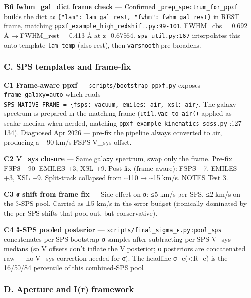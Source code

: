 \documentclass[
  10pt,
]{article}
\begin{document}
\textbf{B6 fwhm\_gal\_dict frame check} --- Confirmed \texttt{\_prep\_spectrum\_for\_ppxf} builds the dict as \texttt{\{"lam":\ lam\_gal\_rest,\ "fwhm":\ fwhm\_gal\_rest\}} in REST frame, matching
\texttt{ppxf\_example\_high\_redshift.py:99-101}. FWHM\_obs = 0.692 Å → FWHM\_rest = 0.413 Å at z=0.67564. \texttt{sps\_util.py:167} interpolates this onto template \texttt{lam\_temp} (also rest),
then \texttt{varsmooth} pre-broadens.

\hypertarget{c.-sps-templates-and-frame-fix}{%
\subsubsection{C. SPS templates and frame-fix}\label{c.-sps-templates-and-frame-fix}}

\textbf{C1 Frame-aware ppxf} --- \texttt{scripts/bootstrap\_ppxf.py} exposes \texttt{frame\_galaxy=\textquotesingle{}auto\textquotesingle{}} which reads
\texttt{SPS\_NATIVE\_FRAME\ =\ \{fsps:\ vacuum,\ emiles:\ air,\ xsl:\ air\}}. The galaxy spectrum is prepared in the matching frame (\texttt{util.vac\_to\_air()} applied as scalar median when needed,
matching \texttt{ppxf\_example\_kinematics\_sdss.py} :127-134). Diagnosed Apr 2026 --- pre-fix the pipeline always converted to air, producing a −90 km/s FSPS V\_sys offset.

\textbf{C2 V\_sys closure} --- Same galaxy spectrum, swap only the frame. Pre-fix: FSPS −90, EMILES +3, XSL +9. Post-fix (frame-aware): FSPS −7, EMILES +3, XSL +9. Split-track collapsed from
\textasciitilde110 → \textasciitilde15 km/s. NOTES Test 3.

\textbf{C3 σ shift from frame fix} --- Side-effect on σ: ≤5 km/s per SPS, ≤2 km/s on the 3-SPS pool. Carried as ±5 km/s in the error budget (ironically dominated by the per-SPS shifts that pool out,
but conservative).

\textbf{C4 3-SPS pooled posterior} --- \texttt{scripts/final\_sigma\_e.py:pool\_sps} concatenates per-SPS bootstrap σ samples after subtracting per-SPS V\_sys medians (so V offsets don't inflate the V
posterior; σ posteriors are concatenated raw --- no V\_sys correction needed for σ). The headline σ\_e(\textless R\_e) is the 16/50/84 percentile of this combined-SPS pool.

\hypertarget{d.-aperture-and-ir-framework}{%
\subsubsection{D. Aperture and I(r) framework}\label{d.-aperture-and-ir-framework}}
\end{document}
